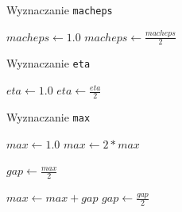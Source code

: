 \documentclass{article}
\begin{document}
\begin{algorithm}
    \caption{Wyznaczanie \texttt{macheps}}
    \begin{algorithmic}
    \State $macheps \gets 1.0$
        \State $macheps \gets \frac{macheps}{2}$
    \EndWhile
    \end{algorithmic}
\end{algorithm}

\begin{algorithm}
    \caption{Wyznaczanie \texttt{eta}}
    \begin{algorithmic}
        \State $eta \gets 1.0$
            \State $eta \gets \frac{eta}{2}$
        \EndWhile
    \end{algorithmic}
\end{algorithm}

\begin{algorithm}
    \caption{Wyznaczanie \texttt{max}}
    \begin{algorithmic}
        \State $max \gets 1.0$
            \State $max \gets 2 * max$
        \EndWhile

        \State $gap \gets \frac{max}{2}$

            \State $max \gets max + gap$
            \State $gap \gets \frac{gap}{2}$
        \EndWhile
    \end{algorithmic}
\end{algorithm}
\end{document}
